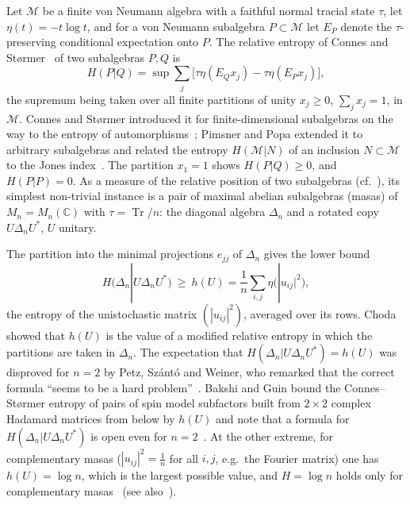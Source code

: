\documentclass[11pt]{article}
\DeclareMathOperator{\Tr}{Tr}
\newcommand{\C}{\mathbb{C}}
\newcommand{\M}{\mathcal{M}}
\theoremstyle{plain}
\theoremstyle{definition}
\theoremstyle{remark}
\begin{document}
Let $\M$ be a finite von Neumann algebra with a faithful normal tracial state $\tau$, let $\eta(t)=-t\log t$, and for a
von Neumann subalgebra $P\subset\M$ let $E_P$ denote the $\tau$-preserving conditional expectation onto $P$. The relative
entropy of Connes and St{\o}rmer~\cite{connes1975} of two subalgebras $P,Q$ is
\begin{equation}\label{eq:cs}
  H(P|Q)=\sup\sum_j\bigl[\tau\eta(E_Qx_j)-\tau\eta(E_Px_j)\bigr],
\end{equation}
the supremum being taken over all finite partitions of unity $x_j\ge0$, $\sum_jx_j=1$, in $\M$. Connes and St{\o}rmer
introduced it for finite-dimensional subalgebras on the way to the entropy of automorphisms~\cite{connes1975}; Pimsner
and Popa extended it to arbitrary subalgebras and related the entropy $H(\M|N)$ of an inclusion $N\subset\M$ to the
Jones index~\cite{pimsner1986,jones1983}. The partition $x_1=1$ shows $H(P|Q)\ge0$, and $H(P|P)=0$. As a measure of the
relative position of two subalgebras (cf.~\cite{bakshi}), its simplest non-trivial instance is a pair of maximal
abelian subalgebras (masas) of $M_n=M_n(\C)$ with $\tau=\Tr/n$: the diagonal algebra $\Delta_n$ and a rotated copy
$U\Delta_nU^*$, $U$ unitary.

The partition into the minimal projections $e_{jj}$ of $\Delta_n$ gives the lower bound
\begin{equation}\label{eq:choda}
  H(\Delta_n|U\Delta_nU^*)\ \ge\ h(U)=\frac1n\sum_{i,j}\eta\bigl(|u_{ij}|^2\bigr),
\end{equation}
the entropy of the unistochastic matrix $(|u_{ij}|^2)$, averaged over its rows. Choda~\cite{choda} showed that $h(U)$ is
the value of a modified relative entropy in which the partitions are taken in $\Delta_n$. The expectation that
$H(\Delta_n|U\Delta_nU^*)=h(U)$ was disproved for $n=2$ by Petz, Sz\'ant\'o and Weiner, who remarked that the correct
formula ``seems to be a hard problem''~\cite[Appendix]{petz2009}. Bakshi and Guin bound the Connes--St{\o}rmer entropy
of pairs of spin model subfactors built from $2\times2$ complex Hadamard matrices from below by $h(U)$ and note that a
formula for $H(\Delta_n|U\Delta_nU^*)$ is open even for $n=2$~\cite[Section~2.3 and Theorem~6.22]{bakshi}. At the other
extreme, for complementary masas ($|u_{ij}|^2=\frac1n$ for all $i,j$, e.g.\ the Fourier matrix) one has
$h(U)=\log n$, which is the largest possible value, and $H=\log n$ holds only for complementary
masas~\cite[Theorem~3]{petz2009} (see also~\cite[Theorem~4.11]{ghosh2026}).
\end{document}
